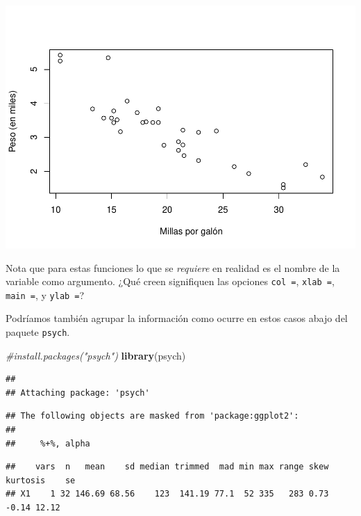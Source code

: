 \documentclass[
]{article}
\newenvironment{Shaded}{\begin{snugshade}}{\end{snugshade}}
\newcommand{\CommentTok}[1]{\textcolor[rgb]{0.56,0.35,0.01}{\textit{#1}}}
\newcommand{\FunctionTok}[1]{\textcolor[rgb]{0.13,0.29,0.53}{\textbf{#1}}}
\newcommand{\NormalTok}[1]{#1}
\newcommand{\SpecialCharTok}[1]{\textcolor[rgb]{0.81,0.36,0.00}{\textbf{#1}}}
\begin{document}
\includegraphics{Taller-R-1_files/figure-latex/unnamed-chunk-6-3.pdf}

Nota que para estas funciones lo que se \emph{requiere} en realidad es
el nombre de la variable como argumento. ¿Qué creen signifiquen las
opciones \texttt{col\ =}, \texttt{xlab\ =}, \texttt{main\ =}, y
\texttt{ylab\ =}?

Podríamos también agrupar la información como ocurre en estos casos
abajo del paquete \texttt{psych}.

\begin{Shaded}
\begin{Highlighting}[]
\CommentTok{\#install.packages("psych")}
\FunctionTok{library}\NormalTok{(psych)}
\end{Highlighting}
\end{Shaded}

\begin{verbatim}
## 
## Attaching package: 'psych'
\end{verbatim}

\begin{verbatim}
## The following objects are masked from 'package:ggplot2':
## 
##     %+%, alpha
\end{verbatim}

\begin{Shaded}
\end{Shaded}

\begin{verbatim}
##    vars  n   mean    sd median trimmed  mad min max range skew kurtosis    se
## X1    1 32 146.69 68.56    123  141.19 77.1  52 335   283 0.73    -0.14 12.12
\end{verbatim}
\end{document}
